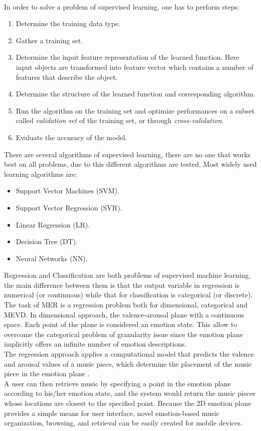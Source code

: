 \\
In order to solve a problem of supervised learning, one has to perform steps:
\begin{enumerate}
	\item Determine the training data type.
	\item Gather a training set.
	\item Determine the input feature representation of the learned function. Here input objects are transformed into feature vector which contains a number of features that describe the object.
	\item Determine the structure of the learned function and corresponding algorithm.
	\item Run the algorithm on the training set and optimize performances on a subset called \textit{validation set} of the training set, or through \textit{cross-validation}.
	\item Evaluate the accuracy of the model.
\end{enumerate}
There are several algorithms of supervised learning, there are no one that works best on all problems, due to this different algorithms are tested. Most widely used learning algorithms are:
\begin{itemize}
	\item Support Vector Machines (SVM).
	\item Support Vector Regression (SVR).
	\item Linear Regression (LR).
	\item Decision Tree (DT).
	\item Neural Networks (NN).
\end{itemize}
Regression and Classification are both problems of supervised machine learning, the main difference between them is that the output variable in regression is numerical (or continuous) while that for classification is categorical (or discrete).
\\ \indent
The task of MER is a regression problem both for dimensional, categorical and MEVD. In dimensional approach, the valence-arousal plane with a continuous space. Each point of the plane is considered an emotion state. This allow to overcome the categorical problem of granularity issue since the emotion plane implicitly offers an infinite number of emotion descriptions.
\\
The regression approach applies a computational model that predicts the valence and arousal values of a music piece, which determine the placement of the music piece in the emotion plane \cite{yang2011music}.
\\ \indent
A user can then retrieve music by specifying a point in the emotion plane according to his/her emotion state, and the system would return the music pieces whose locations are closest to the specified point. Because the 2D emotion plane provides a simple means for user interface, novel emotion-based music organization, browsing, and retrieval can be easily created for mobile devices.

